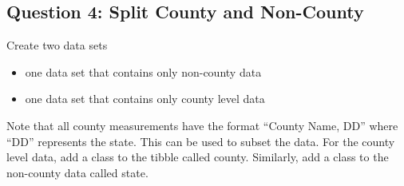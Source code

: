 \documentclass[
  letterpaper,
  DIV=11,
  numbers=noendperiod]{scrartcl}
\newenvironment{Shaded}{\begin{snugshade}}{\end{snugshade}}
\newcommand{\AttributeTok}[1]{\textcolor[rgb]{0.40,0.45,0.13}{#1}}
\newcommand{\CommentTok}[1]{\textcolor[rgb]{0.37,0.37,0.37}{#1}}
\newcommand{\FunctionTok}[1]{\textcolor[rgb]{0.28,0.35,0.67}{#1}}
\newcommand{\NormalTok}[1]{\textcolor[rgb]{0.00,0.23,0.31}{#1}}
\newcommand{\OtherTok}[1]{\textcolor[rgb]{0.00,0.23,0.31}{#1}}
\newcommand{\SpecialCharTok}[1]{\textcolor[rgb]{0.37,0.37,0.37}{#1}}
\newcommand{\StringTok}[1]{\textcolor[rgb]{0.13,0.47,0.30}{#1}}
\begin{document}
\subsection{Question 4: Split County and
Non-County}\label{question-4-split-county-and-non-county}

Create two data sets

\begin{itemize}
\item
  one data set that contains only non-county data
\item
  one data set that contains only county level data
\end{itemize}

Note that all county measurements have the format ``County Name, DD''
where ``DD'' represents the state. This can be used to subset the data.
For the county level data, add a class to the tibble called county.
Similarly, add a class to the non-county data called state.

\begin{Shaded}
\end{Shaded}
\end{document}
